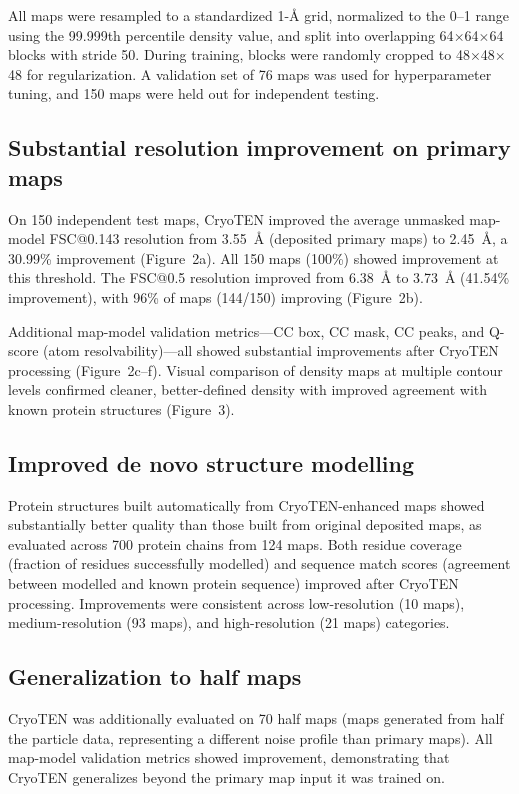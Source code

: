 \documentclass[11pt]{article}
\begin{document}
All maps were resampled to a standardized 1-\AA{} grid, normalized to the 0--1 range using the 99.999th percentile density value, and split into overlapping 64$\times$64$\times$64 blocks with stride 50. During training, blocks were randomly cropped to 48$\times$48$\times$48 for regularization. A validation set of 76 maps was used for hyperparameter tuning, and 150 maps were held out for independent testing.

\subsection{Substantial resolution improvement on primary maps}

On 150 independent test maps, CryoTEN improved the average unmasked map-model FSC@0.143 resolution from 3.55~\AA{} (deposited primary maps) to 2.45~\AA{}, a 30.99\% improvement (Figure~2a). All 150 maps (100\%) showed improvement at this threshold. The FSC@0.5 resolution improved from 6.38~\AA{} to 3.73~\AA{} (41.54\% improvement), with 96\% of maps (144/150) improving (Figure~2b).

Additional map-model validation metrics---CC box, CC mask, CC peaks, and Q-score (atom resolvability)---all showed substantial improvements after CryoTEN processing (Figure~2c--f). Visual comparison of density maps at multiple contour levels confirmed cleaner, better-defined density with improved agreement with known protein structures (Figure~3).

\subsection{Improved de novo structure modelling}

Protein structures built automatically from CryoTEN-enhanced maps showed substantially better quality than those built from original deposited maps, as evaluated across 700 protein chains from 124 maps. Both residue coverage (fraction of residues successfully modelled) and sequence match scores (agreement between modelled and known protein sequence) improved after CryoTEN processing. Improvements were consistent across low-resolution (10 maps), medium-resolution (93 maps), and high-resolution (21 maps) categories.

\subsection{Generalization to half maps}

CryoTEN was additionally evaluated on 70 half maps (maps generated from half the particle data, representing a different noise profile than primary maps). All map-model validation metrics showed improvement, demonstrating that CryoTEN generalizes beyond the primary map input it was trained on.
\end{document}
